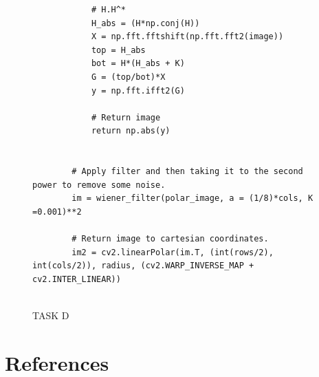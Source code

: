 {\begin{figure}[H]
\begin{lstlisting}
            # H.H^*
            H_abs = (H*np.conj(H))
            X = np.fft.fftshift(np.fft.fft2(image))
            top = H_abs
            bot = H*(H_abs + K)
            G = (top/bot)*X
            y = np.fft.ifft2(G)
        
            # Return image
            return np.abs(y)
        
        
        # Apply filter and then taking it to the second power to remove some noise.
        im = wiener_filter(polar_image, a = (1/8)*cols, K =0.001)**2
        
        # Return image to cartesian coordinates.
        im2 = cv2.linearPolar(im.T, (int(rows/2), int(cols/2)), radius, (cv2.WARP_INVERSE_MAP + cv2.INTER_LINEAR))
        
    \end{lstlisting}
\caption{TASK D}
\label{TASK D}
\end{figure}






\section{References}
\begingroup
\renewcommand{\section}[2]{}%


\endgroup















 








